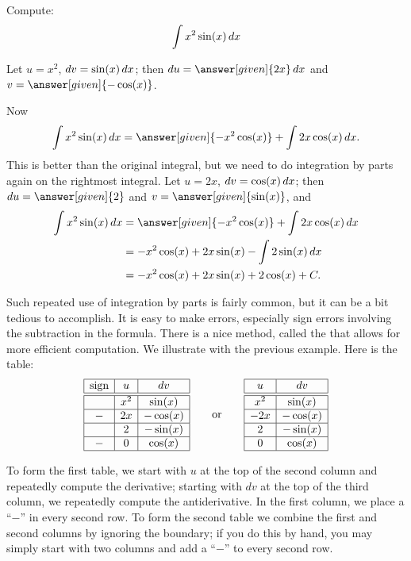 \documentclass{ximera}
\begin{document}
\begin{example}
Compute:
\[
\int x^2\sin(x)\mathop{}\!d x
\] 
\begin{explanation}
Let $u=x^2$, $\mathop{}\!d v=\sin(x)\mathop{}\!d x$; then $\d u=\answer[given]{2x}\d x$ and $v=\answer[given]{-\cos(x)}$. 

Now 
\[
\int x^2\sin(x)\d x=\answer[given]{-x^2\cos(x)}+\int 2x\cos(x)\d x.
\] 
This is better than the original integral, but we need to do
integration by parts again on the rightmost integral. Let $u=2x$, $\mathop{}\!d v=\cos(x)\mathop{}\!d x$; then $\d u=\answer[given]{2}$
and $v=\answer[given]{\sin(x)}$, and
\begin{align*}
  \int x^2\sin(x)\d x &=\answer[given]{-x^2\cos(x)}+\int 2x\cos(x)\d x \\
  &=-x^2\cos(x)+ 2x\sin(x) - \int 2\sin(x)\d x \\
  &=-x^2\cos(x)+ 2x\sin(x) + 2\cos(x) + C. 
\end{align*}
\end{explanation}
\end{example}





Such repeated use of integration by parts is fairly common, but it can
be a bit tedious to accomplish.  It is easy to make errors, especially
sign errors involving the subtraction in the formula. There is a nice
method, called the  that allows for more efficient
computation.  We illustrate with the previous example. Here is the
table:
\[
\begin{array}{|c|c|c|}\hline
\text{sign} & u & dv \\ \hline \hline
 & x^2 & \sin(x) \\ \hline
- & 2x & -\cos(x) \\ \hline
  & 2  & -\sin(x) \\ \hline
- & 0  & \cos(x) \\ \hline
\end{array}
\qquad\text{or}\qquad
\begin{array}{|c|c|}\hline
u & dv \\ \hline\hline
x^2 & \sin(x) \\ \hline 
-2x & -\cos(x) \\\hline
2 & -\sin(x)\\\hline
0 & \cos(x)\\\hline
\end{array}
\]

To form the first table, we start with $u$ at the top of the second
column and repeatedly compute the derivative; starting with $dv$ at
the top of the third column, we repeatedly compute the
antiderivative. In the first column, we place a ``$-$'' in every
second row. To form the second table we combine the first and second
columns by ignoring the boundary; if you do this by hand, you may
simply start with two columns and add a ``$-$'' to every second row.
\end{document}

